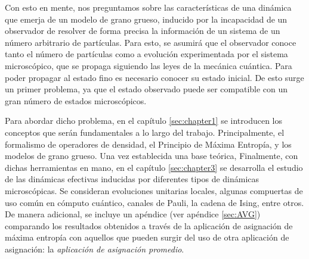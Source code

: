 
Con esto en mente, nos preguntamos sobre las características de una dinámica que emerja de un modelo de grano grueso, inducido por la incapacidad de un observador de resolver de forma precisa la información de un sistema de un número arbitrario de partículas. Para esto, se asumirá que el observador conoce tanto el número de partículas como a evolución experimentada por el sistema microscópico, que se propaga siguiendo las leyes de la mecánica cuántica. Para poder propagar al estado fino es necesario conocer su estado inicial. De esto surge un primer problema, ya que el estado observado puede ser compatible con un gran número de estados microscópicos.  


Para abordar dicho problema, en el capítulo \ref{sec:chapter1} se introducen los conceptos que serán fundamentales a lo largo del trabajo. Principalmente, el formalismo de operadores de densidad, el Principio de Máxima Entropía, y los modelos de grano grueso. Una vez establecida una base teórica,    Finalmente, con dichas herramientas en mano, en el capítulo \ref{sec:chapter3} se desarrolla el estudio de las dinámicas efectivas inducidas por diferentes tipos de dinámicas microscópicas. Se consideran evoluciones unitarias locales, algunas compuertas de uso común en cómputo cuántico, canales de Pauli, la cadena de Ising, entre otros. De manera adicional, se incluye un apéndice (ver apéndice \ref{sec:AVG}) comparando los resultados obtenidos a través de la aplicación de asignación de máxima entropía con aquellos que pueden surgir del uso de otra aplicación de asignación: la \textit{aplicación de asignación promedio}.